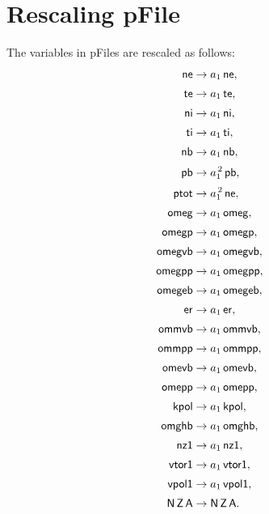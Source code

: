 \documentclass[12pt]{article}
\begin{document}
\section{Rescaling pFile}
The variables in pFiles are rescaled as follows:
\begin{align}
{\sf ne} &\rightarrow a_1\,{\sf ne},\\[0.5ex]
{\sf te} &\rightarrow a_1\,{\sf te},\\[0.5ex]
{\sf ni}& \rightarrow a_1\,{\sf ni},\\[0.5ex]
{\sf ti}&\rightarrow a_1\,{\sf ti},\\[0.5ex]
{\sf nb} &\rightarrow a_1\, {\sf nb},\\[0.5ex]
{\sf pb} &\rightarrow a_1^{\,2}\,{\sf pb},\\[0.5ex]
{\sf ptot} &\rightarrow a_1^{\,2}\,{\sf ne},\\[0.5ex]
{\sf omeg} &\rightarrow a_1\,{\sf omeg},\\[0.5ex]
{\sf omegp}& \rightarrow a_1\,{\sf omegp},\\[0.5ex]
{\sf omegvb}&\rightarrow a_1\,{\sf omegvb},\\[0.5ex]
{\sf omegpp} &\rightarrow a_1\, {\sf omegpp},\\[0.5ex]
{\sf omegeb} &\rightarrow a_1\,{\sf omegeb},\\[0.5ex]
{\sf er} &\rightarrow a_1\,{\sf er},\\[0.5ex]
{\sf ommvb}& \rightarrow a_1\,{\sf ommvb},\\[0.5ex]
{\sf ommpp}&\rightarrow a_1\,{\sf ommpp},\\[0.5ex]
{\sf omevb} &\rightarrow a_1\, {\sf omevb},\\[0.5ex]
{\sf omepp} &\rightarrow a_1\,{\sf omepp},\\[0.5ex]
{\sf kpol} &\rightarrow a_1\,{\sf kpol},\\[0.5ex]
{\sf omghb}& \rightarrow a_1\,{\sf omghb},\\[0.5ex]
{\sf nz1}&\rightarrow a_1\,{\sf nz1},\\[0.5ex]
{\sf vtor1} &\rightarrow a_1\, {\sf vtor1},\\[0.5ex]
{\sf vpol1} &\rightarrow a_1\,{\sf vpol1},\\[0.5ex]
{\sf N\,Z\,A} &\rightarrow {\sf N\,Z\,A}.
\end{align}
\end{document}
